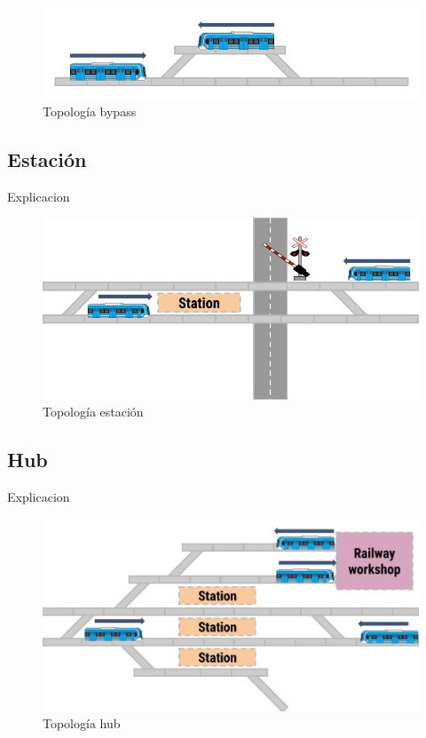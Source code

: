 		\begin{figure}[h]
		\centering
			\includegraphics[scale=.5]{./Figures/Bypass_2}
			\caption{Topología bypass}
			\label{fig:Bypass}
		\end{figure}
			
	\subsection{Estación}

		Explicacion
		
			\begin{figure}[h]
			\centering
				\includegraphics[scale=.5]{./Figures/Estacion}
				\caption{Topología estación}
				\label{fig:Estacion}
			\end{figure}

	\subsection{Hub}
	
		Explicacion
		
			\begin{figure}[h]
			\centering
				\includegraphics[scale=.45]{./Figures/Hub}
				\caption{Topología hub}
				\label{fig:Hub}
			\end{figure}
	
